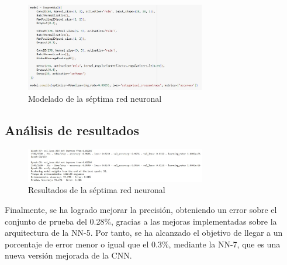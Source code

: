 \begin{figure}[H]
	\centering
	\includegraphics[width=0.7\textwidth]{imgs/model-red7.JPG}
	\caption{Modelado de la séptima red neuronal}
	\label{fig:model-red7}
\end{figure}

\subsection{Análisis de resultados}

\begin{figure}[H]
	\centering
	\includegraphics[width=0.7\textwidth]{imgs/results-red7.JPG}
	\caption{Resultados de la séptima red neuronal}
	\label{fig:results-red7}
\end{figure}

Finalmente, se ha logrado mejorar la precisión, obteniendo un error sobre el conjunto de prueba del 0.28\%, gracias a las mejoras implementadas sobre la arquitectura de la NN-5. Por tanto, se ha alcanzado el objetivo de llegar a un porcentaje de error menor o igual que el 0.3\%, mediante la NN-7, que es una nueva versión mejorada de la CNN.
